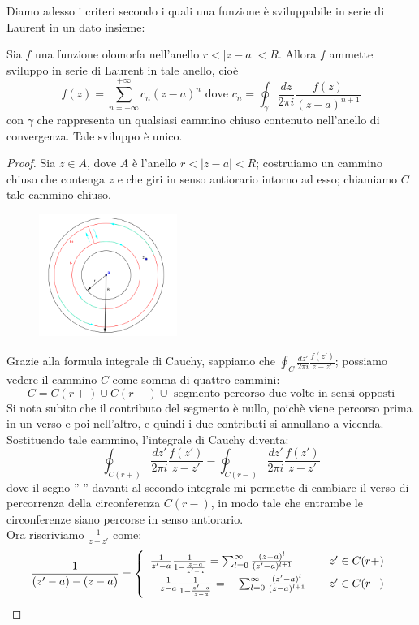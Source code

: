 Diamo adesso i criteri secondo i quali una funzione è sviluppabile in serie di Laurent in un dato insieme:
\begin{teorema}
Sia $f$ una funzione olomorfa nell'anello $r<|z-a|<R$. Allora $f$ ammette sviluppo in serie di Laurent in tale anello, cioè
$$f(z)=\sum_{n=-\infty} ^{+\infty} c_n (z-a)^n \text{ dove } c_n= \oint_{\gamma} \frac{dz}{2 \pi i} \frac{f(z)}{(z-a)^{n+1}}$$
con $\gamma$ che rappresenta un qualsiasi cammino chiuso contenuto nell'anello di convergenza. Tale sviluppo è unico.
\end{teorema}
\begin{proof}
Sia $z \in A$, dove $A$ è l'anello $r<|z-a|<R$; costruiamo un cammino chiuso che contenga $z$ e che giri in senso antiorario intorno ad esso; chiamiamo $C$ tale cammino chiuso.
\begin{figure}[h!]
  \centering
    \includegraphics[width=0.4\textwidth]{immagini/teorema_laurent.png}
\end{figure}
Grazie alla formula integrale di Cauchy, sappiamo che  $\oint_C \frac{dz'}{2 \pi i} \frac{f(z')}{z-z'}$; possiamo vedere il cammino $C$ come somma di quattro cammini:
$$C=C(r+) \cup C(r-) \cup \text{ segmento percorso due volte in sensi opposti}$$
Si nota subito che il contributo del segmento è nullo, poichè viene percorso prima in un verso e poi nell'altro, e quindi i due contributi si annullano a vicenda. \\
Sostituendo tale cammino, l'integrale di Cauchy diventa:
$$\oint_{C(r+)} \frac{dz'}{2 \pi i} \frac{f(z')}{z-z'} - \oint_{C(r-)} \frac{dz'}{2 \pi i} \frac{f(z')}{z-z'}$$
dove il segno ''-'' davanti al secondo integrale mi permette di cambiare il verso di percorrenza della circonferenza $C(r-)$, in modo tale che entrambe le circonferenze siano percorse in senso antiorario.\\
Ora riscriviamo $\frac{1}{z-z'}$ come:
$$\frac{1}{(z'-a)-(z-a)}=\left\{  \begin{array}{l l}    \frac{1}{z'-a} \frac{1}{1-\frac{z-a}{z'-a}}=\sum_{l=0} ^{\infty} \frac{(z-a)^l}{(z'-a)^{l+1}} & \quad z' \in C(r+)\\    -\frac{1}{z-a} \frac{1}{1-\frac{z'-a}{z-a}}=-\sum_{l=0} ^{\infty} \frac{(z'-a)^l}{(z-a)^{l+1}} & \quad z' \in C(r-)  \end{array} \right.$$

\end{proof}
